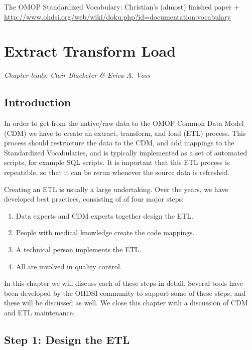 \documentclass[11pt]{book}
\providecommand{\tightlist}{%
  \setlength{\itemsep}{0pt}\setlength{\parskip}{0pt}}
\theoremstyle{definition}
\theoremstyle{definition}
\theoremstyle{definition}
\theoremstyle{remark}
\begin{document}
The OMOP Standardized Vocabulary: Christian's (almost) finished paper + \url{http://www.ohdsi.org/web/wiki/doku.php?id=documentation:vocabulary}

\hypertarget{ExtractTransformLoad}{%
\chapter{Extract Transform Load}\label{ExtractTransformLoad}}

\emph{Chapter leads: Clair Blacketer \& Erica A. Voss}

\hypertarget{introduction-1}{%
\section{Introduction}\label{introduction-1}}

In order to get from the native/raw data to the OMOP Common Data Model (CDM) we have to create an extract, transform, and load (ETL) process. This process should restructure the data to the CDM, and add mappings to the Standardized Vocabularies, and is typically implemented as a set of automated scripts, for example SQL scripts. It is important that this ETL process is repeatable, so that it can be rerun whenever the source data is refreshed.    

Creating an ETL is usually a large undertaking. Over the years, we have developed best practices, consisting of of four major steps:

\begin{enumerate}
\def\labelenumi{\arabic{enumi}.}
\tightlist
\item
  Data experts and CDM experts together design the ETL.
\item
  People with medical knowledge create the code mappings.
\item
  A technical person implements the ETL.
\item
  All are involved in quality control.
\end{enumerate}

In this chapter we will discuss each of these steps in detail. Several tools have been developed by the OHDSI community to support some of these steps, and these will be discussed as well. We close this chapter with a discussion of CDM and ETL maintenance.

\hypertarget{step-1-design-the-etl}{%
\section{Step 1: Design the ETL}\label{step-1-design-the-etl}}
\end{document}

